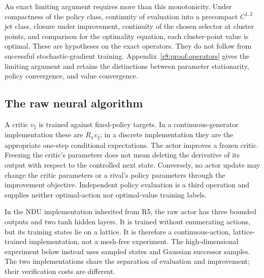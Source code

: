 An exact limiting argument requires more than this monotonicity. Under compactness of the policy class, continuity of evaluation into a precompact $C^{1,2}$ jet class, closure under improvement, continuity of the chosen selector at cluster points, and comparison for the optimality equation, each cluster-point value is optimal. These are hypotheses on the exact operators. They do not follow from successful stochastic-gradient training. Appendix~\ref{r8:proof:operators} gives the limiting argument and retains the distinctions between parameter stationarity, policy convergence, and value convergence.

\subsection{The raw neural algorithm}
A critic $v_\xi$ is trained against fixed-policy targets. In a continuous-generator implementation these are $R_\pi v_\xi$; in a discrete implementation they are the appropriate one-step conditional expectations. The actor improves a frozen critic. Freezing the critic's parameters does not mean deleting the derivative of its output with respect to the controlled next state. Conversely, no actor update may change the critic parameters or a rival's policy parameters through the improvement objective. Independent policy evaluation is a third operation and supplies neither optimal-action nor optimal-value training labels.

In the NDU implementation inherited from R5, the raw actor has three bounded outputs and two tanh hidden layers. It is trained without enumerating actions, but its training states lie on a lattice. It is therefore a continuous-action, lattice-trained implementation, not a mesh-free experiment. The high-dimensional experiment below instead uses sampled states and Gaussian successor samples. The two implementations share the separation of evaluation and improvement; their verification costs are different.

